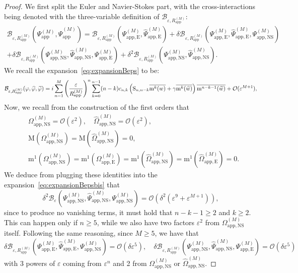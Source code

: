 \documentclass[11pt,reqno,a4paper]{amsart}
\def\eps{\varepsilon}
\newcommand{\cB}{\mathcal{B}}
\newcommand{\cO}{\mathcal{O}}
\newcommand{\mrm}{\mathrm{m}}
\newcommand{\mrM}{\mathrm{M}}
\newcommand{\1}{\mathbbm{1}}
\theoremstyle{definition}
\theoremstyle{definition}
\numberwithin{equation}{section}
\newcommand{\Mapp}[2]{#1^{(#2)}_\mathrm{app}}
\newcommand{\Mappp}[3]{#1^{(#2)}_\mathrm{app,#3}}
\begin{document}
\begin{proof}
    We first split the Euler and Navier-Stokes part, with the cross-interactions being denoted with the three-variable definition of $\cB_{\eps,\Mapp{R}{M}}$:
\begin{multline}
        \cB_{\eps,\Mapp{R}{M}}(\Mapp{\Psi}{M},\Mapp{\widehat{\Psi}}{M}) = \cB_{\eps,\Mapp{R}{M}}(\Mappp{\Psi}{M}{E},\Mappp{\widehat{\Psi}}{M}{E})  + \delta \cB_{\eps,\Mapp{R}{M}}( \Mappp{\Psi}{M}{E},\Mappp{\widehat{\Psi}}{M}{E} ,\Mappp{\Psi}{M}{NS}) \\ + \delta \cB_{\eps,\Mapp{R}{M}}( \Mappp{\Psi}{M}{NS},\Mappp{\widehat{\Psi}}{M}{NS} ,\Mappp{\Psi}{M}{E})  + \delta^2 \cB_{\eps,\Mapp{R}{M}}(\Mappp{\Psi}{M}{NS},\Mappp{\widehat{\Psi}}{M}{NS}).
    \end{multline}
We recall the expansion~\cref{eq:expansionBeps} to be:
\begin{equation}
    \label{eq:expansionBepsbis}
    \cB_{\eps,\Mapp{R}{M}}(\varphi,\widehat{\varphi},\widetilde{\varphi}) = i\sum_{n=1}^M\left(\frac{\eps}{\Mapp{R}{M}}\right)^n\sum_{k=0}^{n-1}(n-k)c_{n,k}\left({\rm S}_{n,n-k}\overline{\mrm^k(w)} + \gamma\overline{\mrm^k(\widehat{w})}\right)\overline{\mrm^{n-k-1}(\widetilde{w})}+\cO(\eps^{M+1}),
\end{equation}
Now, we recall from the construction of the first orders that
    \begin{align}
        & \Mappp{\Omega}{M}{NS} = \cO(\eps^2), \quad \Mappp{\widehat{\Omega}}{M}{NS}= \cO(\eps^2), \\
        &  \mrM(\Mappp{\Omega}{M}{NS}) = \mrM(\Mappp{\widehat{\Omega}}{M}{NS}) = 0,\\ 
        &  \mrm^1(\Mappp{\Omega}{M}{NS}) = \mrm^1(\Mappp{\Omega}{M}{E}) = \mrm^1(\Mappp{\widehat{\Omega}}{M}{NS}) = \mrm^1(\Mappp{\widehat{\Omega}}{M}{E}) = 0.
    \end{align}
We deduce from plugging these identities into the expansion~\cref{eq:expansionBepsbis} that
\begin{equation}\label{eq:delta2Term}
    \delta^2 \cB_\eps(\Mappp{\Psi}{M}{NS},\Mappp{\widehat{\Psi}}{M}{NS},\Mappp{\Psi}{M}{NS}) = \cO(\delta^2 (\eps^9+\eps^{M+1})),
\end{equation}
since to produce no vanishing terms, it must hold that $n-k-1 \ge 2$ and $k \ge 2$. This  can happen only if $n \ge 5$, while we also have two factors $\eps^2$ from $\Mappp{\Omega}{M}{NS}$ itself. Following the same reasoning, since $M \ge 5$, we have that
\begin{equation}\label{eq:deltaTerms}
        \delta \cB_{\eps,\Mapp{R}{M}}( \Mappp{\Psi}{M}{E},\Mappp{\widehat{\Psi}}{M}{E} ,\Mappp{\Psi}{M}{NS}) = \cO(\delta \eps^5), \quad  \delta \cB_{\eps,\Mapp{R}{M}}( \Mappp{\Psi}{M}{NS},\Mappp{\widehat{\Psi}}{M}{NS} ,\Mappp{\Psi}{M}{E}) = \cO(\delta \eps^5)
    \end{equation}
    with 3 powers of $\eps$ coming from $\eps^n$ and 2 from $\Mappp{\Omega}{M}{NS}$ or $\Mappp{\widehat{\Omega}}{M}{NS}$.
    

\end{proof}
\end{document}
